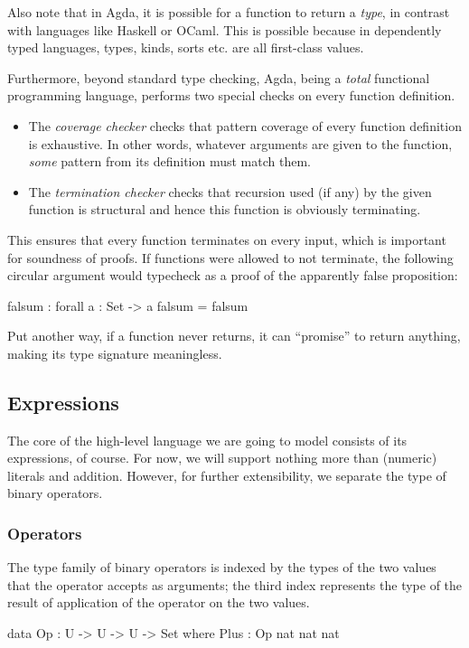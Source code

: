 Also note that in Agda, it is possible for a function to return a \emph{type}, in contrast
with languages like Haskell or OCaml. This is possible because in dependently typed languages,
types, kinds, sorts etc. are all first-class values.

Furthermore, beyond standard type checking, Agda, being a \emph{total} functional
programming language, performs two special checks on every function definition.
\begin{itemize}
	\item The \emph{coverage checker} checks that pattern coverage of every
		function definition is exhaustive. In other words, whatever arguments
		are given to the function, \emph{some} pattern from its definition must match
		them.
	\item The \emph{termination checker} checks that recursion used (if any) by the
		given function is structural and hence this function is obviously terminating.
\end{itemize}
This ensures that every function terminates on every input, which is important for soundness
of proofs. If functions were allowed to not terminate, the following circular argument would
typecheck as a proof of the apparently false proposition:
\begin{code}
  falsum : forall {a : Set} -> a
  falsum = falsum
\end{code}
Put another way, if a function never returns, it can ``promise'' to return anything, making
its type signature meaningless.

\subsection{Expressions}

The core of the high-level language we are going to model consists of its expressions, of
course. For now, we will support nothing more than (numeric) literals and addition.
However, for further extensibility, we separate the type of binary operators.

\subsubsection{Operators}

The type family of binary operators is indexed by the types of the two values that
the operator accepts as arguments; the third index represents the type of
the result of application of the operator on the two values.

\begin{code}
  data Op : U -> U -> U -> Set where
    Plus : Op nat nat nat
\end{code}

